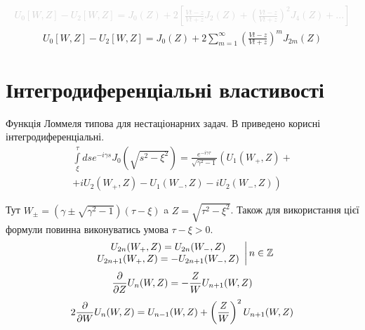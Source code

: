 %
\textcolor{lightgray}{ \begin{equation*} \begin{aligned}
U_0 [W, Z] - U_2 [W, Z] = J_0(Z) + 2 \left[ 
\frac{\mathit{V}t - z}{\mathit{V}t + z} J_2(Z) + \left( 
\frac{\mathit{V}t - z}{\mathit{V}t + z} \right)^2 J_4(Z) + ... \right]
\end{aligned} \end{equation*} }
%
\begin{equation} \begin{aligned}
U_0 [W, Z] - U_2 [W, Z] = J_0(Z) + 2 \sum_{m=1}^{\infty} \left( 
\frac{\mathit{V}t - z}{\mathit{V}t + z} \right)^m J_{2m} (Z)
\end{aligned} \end{equation}

\section{Інтегродиференціальні властивості}

Функція Ломмеля типова для нестаціонарних задач. В \cite[ст. 41]{imp:Borisov1991} 
приведено корисні інтегродиференціальні.
%
\begin{equation} \begin{aligned}
\int \limits_{\xi}^{\tau} ds e^{-i \gamma s} J_0(\sqrt{s^2 - \xi^2 }) = 
\frac{e^{-i \gamma \tau}}{\sqrt{\gamma^2 - 1}} \left( U_1(W_+,Z) + \right. \\ 
\left. + i U_2(W_+,Z) - U_1(W_-,Z) - i U_2(W_-,Z) \right)
\end{aligned} \end{equation}

Тут $ W_\pm = (\gamma \pm \sqrt{\gamma^2 - 1}) (\tau - \xi) $ a 
$ Z = \sqrt{\tau^2 - \xi^2} $. Також для використання цієї формули повинна
виконуватись умова $ \tau - \xi > 0 $.
%
\textcolor{red}{ \begin{equation}
\left. \begin{array}{c}
U_{2n} (W_+, Z) = U_{2n} (W_-, Z) \\
U_{2n+1} (W_+, Z) = - U_{2n+1} (W_-, Z)
\end{array} \right| n \in \mathbb{Z}
\end{equation} }
%
\begin{equation} 
\frac{\partial }{\partial Z} U_n (W,Z) = - \frac{Z}{W} U_{n+1} (W,Z)
\end{equation}
%
\begin{equation}
2 \frac{\partial }{\partial W} U_n (W,Z) = U_{n-1} (W,Z) + 
\left( \frac{Z}{W} \right)^2 U_{n+1} (W,Z)
\end{equation}

